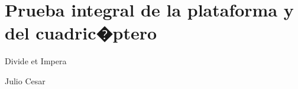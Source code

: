 %
%
%
% 
%
%
%
%
%
%
%

\chapter{Prueba integral de la plataforma y del cuadric�ptero}

\label{cap4:pruebas}

\begin{FraseCelebre}
\begin{Frase}
Divide et Impera
\end{Frase}
\begin{Fuente}
Julio Cesar
\end{Fuente}
\end{FraseCelebre}

